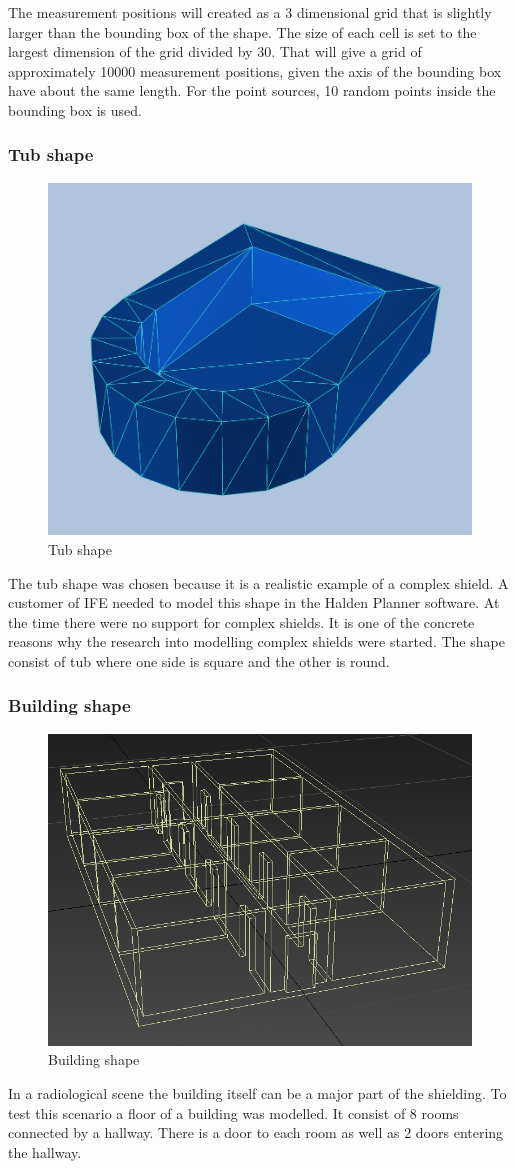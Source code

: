 \documentclass[11pt,twoside,a4paper]{report}
\begin{document}
The measurement positions will created as a 3 dimensional grid that is slightly larger than the bounding box of the shape. The size of each cell is set to the largest dimension of the grid divided by 30. That will give a grid of approximately 10000 measurement positions, given the axis of the bounding box have about the same length. For the point sources, 10 random points inside the bounding box is used. 

\subsubsection{Tub shape}
\begin{figure}[h]
    \centering
    \includegraphics[width=0.45\linewidth]{images/tub_mesh}
    \caption{Tub shape}
    \label{fig:Tub shape}
\end{figure}

The tub shape was chosen because it is a realistic example of a complex shield. A customer of IFE needed to model this shape in the Halden Planner software. At the time there were no support for complex shields. It is one of the concrete reasons why the research into modelling complex shields were started. The shape consist of tub where one side is square and the other is round.

\subsubsection{Building shape}
\begin{figure}[h]
    \centering
    \includegraphics[width=0.45\linewidth]{images/room_max}
    \caption{Building shape}
    \label{fig:Building shape}
\end{figure}
In a radiological scene the building itself can be a major part of the shielding. To test this scenario a floor of a building was modelled. It consist of 8 rooms connected by a hallway. There is a door to each room as well as 2 doors entering the hallway.
\end{document}
